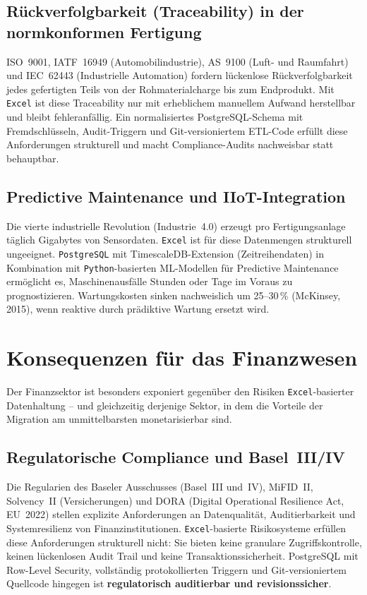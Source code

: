 ﻿\documentclass[12pt,a4paper]{report}
\theoremstyle{definition}
\theoremstyle{remark}
\newcommand{\excel}{\texttt{Excel}}
\newcommand{\pg}{\texttt{PostgreSQL}}
\newcommand{\py}{\texttt{Python}}
\begin{document}
\subsection{Rückverfolgbarkeit (Traceability) in der normkonformen Fertigung}

ISO~9001, IATF~16949 (Automobilindustrie), AS~9100 (Luft- und
Raumfahrt) und IEC~62443 (Industrielle Automation) fordern
lückenlose Rückverfolgbarkeit jedes gefertigten Teils von der
Rohmaterialcharge bis zum Endprodukt.
Mit \excel{} ist diese Traceability nur mit erheblichem manuellem
Aufwand herstellbar und bleibt fehleranfällig.
Ein normalisiertes PostgreSQL-Schema mit Fremdschlüsseln,
Audit-Triggern und Git-versioniertem ETL-Code erfüllt diese
Anforderungen strukturell und macht Compliance-Audits nachweisbar
statt behauptbar.

\subsection{Predictive Maintenance und IIoT-Integration}

Die vierte industrielle Revolution (Industrie~4.0) erzeugt pro
Fertigungsanlage täglich Gigabytes von Sensordaten.
\excel{} ist für diese Datenmengen strukturell ungeeignet.
\pg{} mit TimescaleDB-Extension (Zeitreihendaten) in Kombination
mit \py-basierten ML-Modellen für Predictive Maintenance ermöglicht
es, Maschinenausfälle Stunden oder Tage im Voraus zu prognostizieren.
Wartungskosten sinken nachweislich um 25--30\,\% (McKinsey, 2015),
wenn reaktive durch prädiktive Wartung ersetzt wird.

\section{Konsequenzen für das Finanzwesen}

Der Finanzsektor ist besonders exponiert gegenüber den Risiken
\excel-basierter Datenhaltung -- und gleichzeitig derjenige Sektor,
in dem die Vorteile der Migration am unmittelbarsten monetarisierbar
sind.

\subsection{Regulatorische Compliance und Basel~III/IV}

Die Regularien des Baseler Ausschusses (Basel~III und~IV),
MiFID~II, Solvency~II (Versicherungen) und DORA
(Digital Operational Resilience Act, EU~2022) stellen explizite
Anforderungen an Datenqualität, Auditierbarkeit und Systemresilienz
von Finanzinstitutionen.
\excel-basierte Risikosysteme erfüllen diese Anforderungen strukturell
nicht: Sie bieten keine granulare Zugriffskontrolle, keinen
lückenlosen Audit Trail und keine Transaktionssicherheit.
PostgreSQL mit Row-Level Security, vollständig protokollierten
Triggern und Git-versioniertem Quellcode hingegen ist
\textbf{regulatorisch auditierbar und revisionssicher}.
\end{document}
